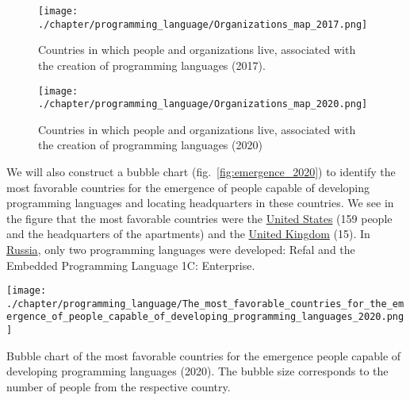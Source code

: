 \label{question:prog_lang_2}

\begin{figure}[h]
\centering
	\texttt{[image: ./chapter/programming\_language/Organizations\_map\_2017.png]}
	\caption{Countries in which people and organizations live, associated with the creation of programming languages (2017).}
	\label{fig:organizations_2017}
\end{figure}

\begin{figure}[h]
\centering
	\texttt{[image: ./chapter/programming\_language/Organizations\_map\_2020.png]}
	\caption{Countries in which people and organizations live, associated with the creation of programming languages (2020)}
	\label{fig:organizations_2020}
\end{figure}

We will also construct a bubble chart (fig.~\ref{fig:emergence_2020}) to identify the most favorable countries for the emergence of people capable of developing programming languages and locating headquarters in these countries. We see in the figure that the most favorable countries were the \href{https://en.wikipedia.org/wiki/United_States}{United States} (159 people and the headquarters of the apartments) and the \href{https://en.wikipedia.org/wiki/United_Kingdom}{United Kingdom} (15). In \href{https://en.wikipedia.org/wiki/Russia}{Russia}, only two programming languages were developed: Refal and the Embedded Programming Language 1C: Enterprise.

\begin{marginfigure}[7cm]
	\texttt{[image: ./chapter/programming\_language/The\_most\_favorable\_countries\_for\_the\_emergence\_of\_people\_capable\_of\_developing\_programming\_languages\_2020.png]}
	\caption{Bubble chart of the most favorable countries for the emergence people capable of developing programming languages (2020). The bubble size corresponds to the number of people from the respective country.}
	\label{fig:emergence_2020}
\end{marginfigure}

